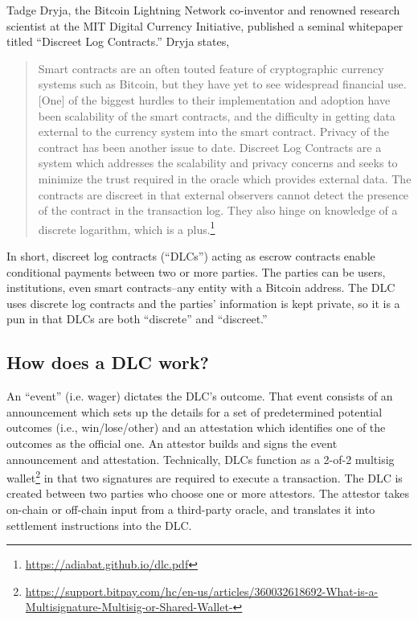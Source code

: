 \documentclass[twoside, a4paper, 11pt]{article}
\begin{document}
  Tadge Dryja, the Bitcoin Lightning Network co-inventor and renowned research scientist at the MIT Digital Currency Initiative, published a seminal whitepaper titled “Discreet Log Contracts.” Dryja states,
  \begin{quote}
    Smart contracts are an often touted feature of cryptographic currency
    systems such as Bitcoin, but they have yet to see widespread financial use.
    [One] of the biggest hurdles to their implementation and adoption have been
    scalability of the smart contracts, and the difficulty in getting data external
    to the currency system into the smart contract. Privacy of the contract has
    been another issue to date. Discreet Log Contracts are a system which
    addresses the scalability and privacy concerns and seeks to minimize the
    trust required in the oracle which provides external data. The contracts are
    discreet in that external observers cannot detect the presence of the contract
    in the transaction log. They also hinge on knowledge of a discrete logarithm,
    which is a plus.\footnote{\url{https://adiabat.github.io/dlc.pdf}}
  \end{quote}

  In short, discreet log contracts (“DLCs”) acting as escrow contracts enable conditional payments between two or more parties. The parties can be users, institutions, even smart contracts–any entity with a Bitcoin address. The DLC uses discrete log contracts and the parties’ information is kept private, so it is a pun in that DLCs are both “discrete” and “discreet.”

  \subsection{How does a DLC work?}

  An “event” (i.e. wager) dictates the DLC’s outcome. That event consists of an announcement which sets up the details for a set of predetermined potential outcomes (i.e., win/lose/other) and an attestation which identifies one of the outcomes as the official one. An attestor builds and signs the event announcement and attestation. Technically, DLCs function as a 2-of-2 multisig wallet\footnote{\url{https://support.bitpay.com/hc/en-us/articles/360032618692-What-is-a-Multisignature-Multisig-or-Shared-Wallet-}}  in that two signatures are required to execute a transaction. The DLC is created between two parties who choose one or more attestors. The attestor takes on-chain or off-chain input from a third-party oracle, and translates it into settlement instructions into the DLC.
\end{document}
